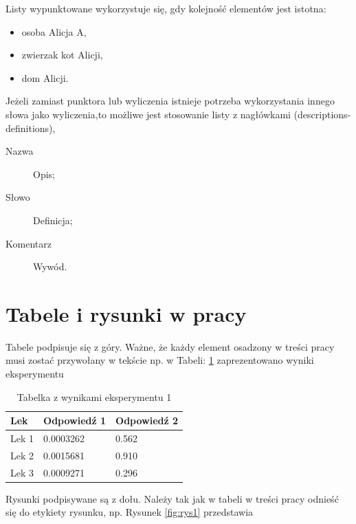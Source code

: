\noindent Listy wypunktowane wykorzystuje się, gdy kolejność elementów jest istotna:
\begin{itemize}
    \item osoba Alicja A,
    \item zwierzak kot Alicji,
    \item dom Alicji.
\end{itemize}

Jeżeli zamiast punktora lub wyliczenia istnieje potrzeba wykorzystania innego słowa jako wyliczenia,to możliwe jest stosowanie listy z nagłówkami (descriptions-definitions),
\begin{description}
    \item[Nazwa] Opis;
    \item[Słowo] Definicja;
    \item[Komentarz] Wywód.
\end{description}


\section{Tabele i rysunki w pracy}

Tabele podpisuje się z góry. Ważne, że każdy element osadzony w treści pracy musi zostać przywołany w tekście np. w Tabeli: \ref{tab:eksperyment1} zaprezentowano wyniki eksperymentu

\begin{table}[h]
    \centering
    \caption{Tabelka z wynikami eksperymentu 1}
    \begin{tabular}{l l l}
        \toprule
        \textbf{Lek} & \textbf{Odpowiedź 1} & \textbf{Odpowiedź 2} \\
        \midrule
        Lek 1        & 0.0003262            & 0.562                \\
        Lek 2        & 0.0015681            & 0.910                \\
        Lek 3        & 0.0009271            & 0.296                \\
        \bottomrule
    \end{tabular}
    \label{tab:eksperyment1} %
\end{table}

Rysunki podpisywane są z dołu. Należy tak jak w tabeli w treści pracy odnieść się do etykiety rysunku, np. Rysunek \ref{fig:rys1} przedstawia

